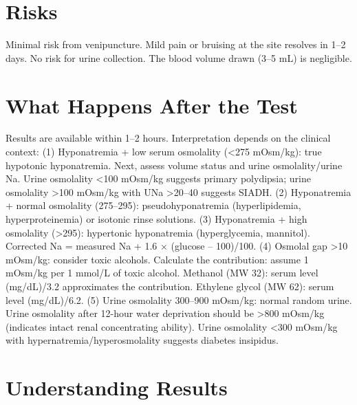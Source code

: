 \section*{Risks}
Minimal risk from venipuncture. Mild pain or bruising at the site resolves in 1--2 days. No risk for urine collection. The blood volume drawn (3--5 mL) is negligible.

\section*{What Happens After the Test}
Results are available within 1--2 hours. Interpretation depends on the clinical context: (1) Hyponatremia + low serum osmolality (<275 mOsm/kg): true hypotonic hyponatremia. Next, assess volume status and urine osmolality/urine Na. Urine osmolality <100 mOsm/kg suggests primary polydipsia; urine osmolality >100 mOsm/kg with UNa >20--40 suggests SIADH. (2) Hyponatremia + normal osmolality (275--295): pseudohyponatremia (hyperlipidemia, hyperproteinemia) or isotonic rinse solutions. (3) Hyponatremia + high osmolality (>295): hypertonic hyponatremia (hyperglycemia, mannitol). Corrected Na = measured Na + 1.6 $\times$ (glucose -- 100)/100. (4) Osmolal gap >10 mOsm/kg: consider toxic alcohols. Calculate the contribution: assume 1 mOsm/kg per 1 mmol/L of toxic alcohol. Methanol (MW 32): serum level (mg/dL)/3.2 approximates the contribution. Ethylene glycol (MW 62): serum level (mg/dL)/6.2. (5) Urine osmolality 300--900 mOsm/kg: normal random urine. Urine osmolality after 12-hour water deprivation should be >800 mOsm/kg (indicates intact renal concentrating ability). Urine osmolality <300 mOsm/kg with hypernatremia/hyperosmolality suggests diabetes insipidus.

\section*{Understanding Results}


